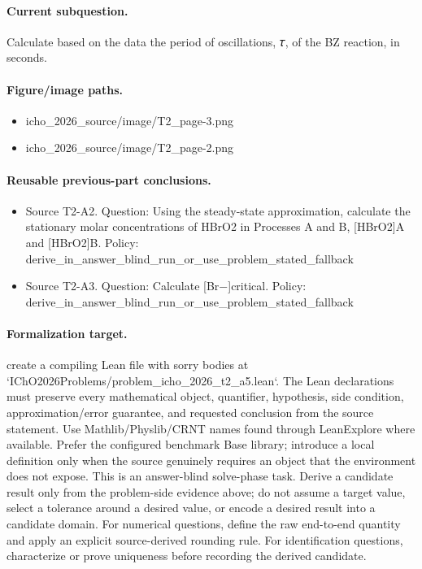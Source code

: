 \paragraph{Current subquestion.}
Calculate based on the data the period of oscillations, 𝜏, of the BZ reaction, in seconds.

\paragraph{Figure/image paths.}
\begin{itemize}
\item icho\_2026\_source/image/T2\_page-3.png
\item icho\_2026\_source/image/T2\_page-2.png
\end{itemize}

\paragraph{Reusable previous-part conclusions.}
\begin{itemize}
\item Source T2-A2. Question: Using the steady-state approximation, calculate the stationary molar concentrations of HBrO2 in Processes A and B, [HBrO2]A and [HBrO2]B. Policy: derive\_in\_answer\_blind\_run\_or\_use\_problem\_stated\_fallback
\item Source T2-A3. Question: Calculate [Br−]critical. Policy: derive\_in\_answer\_blind\_run\_or\_use\_problem\_stated\_fallback
\end{itemize}

\paragraph{Formalization target.}
create a compiling Lean file with sorry bodies at `IChO2026Problems/problem\_icho\_2026\_t2\_a5.lean`.
The Lean declarations must preserve every mathematical object, quantifier, hypothesis, side condition, approximation/error guarantee, and requested conclusion from the source statement.
Use Mathlib/Physlib/CRNT names found through LeanExplore where available. Prefer the configured benchmark Base library; introduce a local definition only when the source genuinely requires an object that the environment does not expose.
This is an answer-blind solve-phase task. Derive a candidate result only from the problem-side evidence above; do not assume a target value, select a tolerance around a desired value, or encode a desired result into a candidate domain.
For numerical questions, define the raw end-to-end quantity and apply an explicit source-derived rounding rule. For identification questions, characterize or prove uniqueness before recording the derived candidate.

